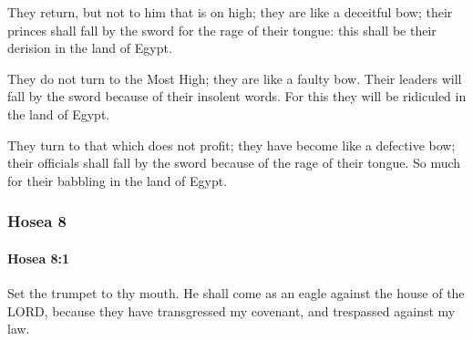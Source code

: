 			\begin{versebox}
					\item[BHS] 
					\item[LXX] 
					\item[ASV] They return, but not to him that is on high; they are like a deceitful bow; their princes shall fall by the sword for the rage of their tongue: this shall be their derision in the land of Egypt.
					\item[NIV] They do not turn to the Most High; they are like a faulty bow. Their leaders will fall by the sword because of their insolent words. For this they will be ridiculed in the land of Egypt.
					\item[NRSV] They turn to that which does not profit; they have become like a defective bow; their officials shall fall by the sword because of the rage of their tongue. So much for their babbling in the land of Egypt.
			\end{versebox}
	\subsubsection{Hosea 8} %
		\label{HOSEA-8}

		\paragraph{Hosea 8:1} %
			\label{HOSEA-8-1}

			Set the trumpet to thy mouth. He shall come as an eagle against the house of the LORD, because they have transgressed my covenant, and trespassed against my law.

